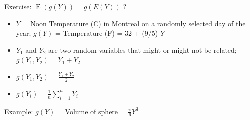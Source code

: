\documentclass[10pt]{beamer}\usepackage[]{graphicx}\usepackage[]{color}
\newcommand{\Expec}{\operatorname{E}}
\begin{document}
\begin{frame}{Exercise: $\Expec(g(Y)) = g(E(Y))$ ?}
	
	\begin{itemize}
		\setlength{\itemsep}{10pt}		
		\item $Y$ = Noon Temperature (C) in Montreal on a randomly selected day of the year;  
		$g(Y)$ = Temperature (F) = 32 + (9/5) $Y$
		\item  $Y_1$ and $Y_2$ are two random variables that might or might not be related; $g(Y_1, Y_2) = Y_1 + Y_2$ 
		\item  $g(Y_1, Y_2) = \frac{Y_1 + Y_2}{2}$  
		\item $g(Y_i) = \frac{1}{n} \sum_{i=1}^{n} Y_i$
	\end{itemize}
	
\end{frame}


\begin{frame}{Example: $g(Y)$ = Volume of sphere = $\frac{\pi}{6}  Y^3$}
	
\end{frame}
\end{document}
